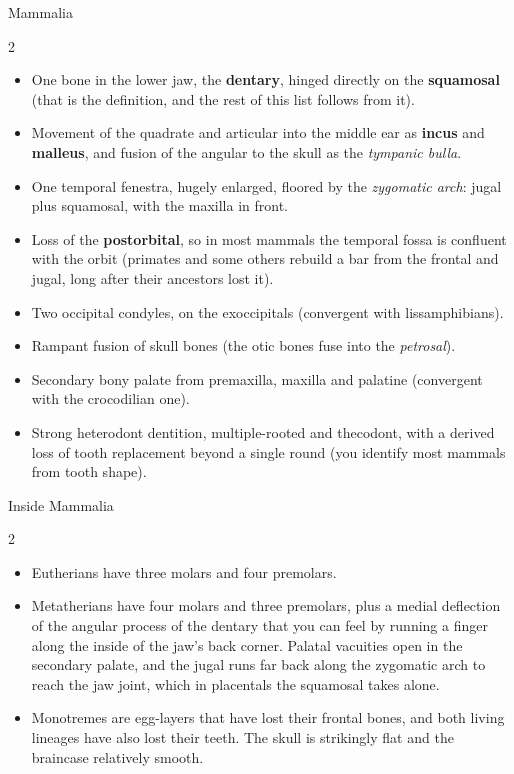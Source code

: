 \documentclass[11pt]{article}
\newcommand{\bone}[1]{\textbf{#1}}
\newcommand{\term}[1]{\textsl{#1}}
\begin{document}
\begin{cladebox}{Mammalia}
\begin{multicols}{2}
\begin{itemize}
\item One bone in the lower jaw, the \bone{dentary}, hinged directly on the
  \bone{squamosal} (that is the definition, and the rest of this list follows
  from it).
\item Movement of the quadrate and articular into the middle ear as
  \bone{incus} and \bone{malleus}, and fusion of the angular to the skull as
  the \term{tympanic bulla}.
\item One temporal fenestra, hugely enlarged, floored by the \term{zygomatic
  arch}: jugal plus squamosal, with the maxilla in front.
\item Loss of the \bone{postorbital}, so in most mammals the temporal fossa is
  confluent with the orbit (primates and some others rebuild a bar from the
  frontal and jugal, long after their ancestors lost it).
\item Two occipital condyles, on the exoccipitals (convergent with lissamphibians).
\item Rampant fusion of skull bones (the otic bones fuse into the \term{petrosal}).
\item Secondary bony palate from premaxilla, maxilla and palatine (convergent with
  the crocodilian one).
\item Strong heterodont dentition, multiple-rooted and thecodont, with a derived
  loss of tooth replacement beyond a single round (you identify most mammals from tooth shape).
\end{itemize}
\end{multicols}
\end{cladebox}

\begin{cladebox}{Inside Mammalia}
\begin{multicols}{2}
\begin{itemize}
\item Eutherians have three molars and four premolars.
\item Metatherians have four molars and three premolars, plus a medial
  deflection of the angular process of the dentary that you can feel by running
  a finger along the inside of the jaw's back corner. Palatal vacuities open in
  the secondary palate, and the jugal runs far back along the zygomatic arch to
  reach the jaw joint, which in placentals the squamosal takes alone.
\item Monotremes are egg-layers that have lost their frontal bones, and both
  living lineages have also lost their teeth. The skull is strikingly flat and
  the braincase relatively smooth.
\end{itemize}
\end{multicols}
\end{cladebox}
\end{document}
